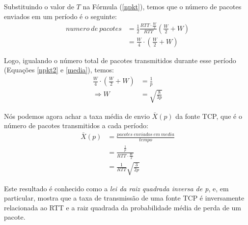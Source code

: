 Substituindo o valor de $T$ na Fórmula (\ref{npkt}), temos que o número de
pacotes enviados em um período é o seguinte:
\begin{align}
\label{npkt2}
numero\ de\ pacotes &= \frac{1}{2}\frac{RTT \cdot
\frac{W}{2}}{RTT}\left(\frac{W}{2} + W\right)\nonumber\\
				&= \frac{W}{4} \cdot \left(\frac{W}{2} + W\right)
\end{align} 

 Logo, igualando o número total de pacotes transmitidos
durante esse período (Equações \ref{npkt2} e \ref{media}), temos:
\begin{align}
\frac{W}{4} \cdot \left(\frac{W}{2} + W\right) &= \frac{1}{p}\nonumber\\
\Rightarrow W &= \sqrt{\frac{8}{3p}}
\end{align}

Nós podemos agora achar a taxa média de envio $\bar{X}(p)$ da fonte TCP, que é o
número de pacotes transmitidos a cada período:
\begin{align}
\bar{X}(p) &= \frac{pacotes\ enviados\ em\ media}{tempo}\nonumber\\ 
	&= \frac{\frac{1}{p}}{RTT \cdot \frac{W}{2}}\nonumber\\
			&= \frac{1}{RTT} \sqrt{\frac{3}{2p}}
\end{align}

Este resultado é conhecido como a \textit{lei da raiz quadrada inversa de p}, e,
em particular, mostra que a taxa de transmissão de uma fonte TCP é inversamente
relacionada ao RTT e a raiz quadrada da probabilidade média de perda de um
pacote.
